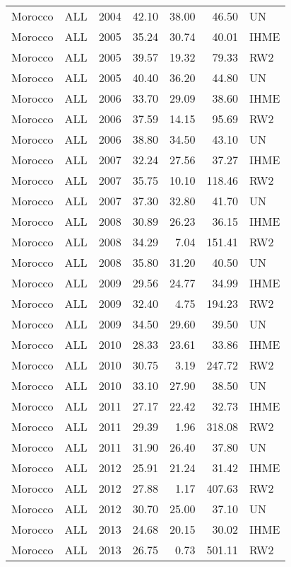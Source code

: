 \begin{longtable}{lllrrrl}
  Morocco & ALL & 2004 & 42.10 & 38.00 & 46.50 & UN \\ 
  Morocco & ALL & 2005 & 35.24 & 30.74 & 40.01 & IHME \\ 
  Morocco & ALL & 2005 & 39.57 & 19.32 & 79.33 & RW2 \\ 
  Morocco & ALL & 2005 & 40.40 & 36.20 & 44.80 & UN \\ 
  Morocco & ALL & 2006 & 33.70 & 29.09 & 38.60 & IHME \\ 
  Morocco & ALL & 2006 & 37.59 & 14.15 & 95.69 & RW2 \\ 
  Morocco & ALL & 2006 & 38.80 & 34.50 & 43.10 & UN \\ 
  Morocco & ALL & 2007 & 32.24 & 27.56 & 37.27 & IHME \\ 
  Morocco & ALL & 2007 & 35.75 & 10.10 & 118.46 & RW2 \\ 
  Morocco & ALL & 2007 & 37.30 & 32.80 & 41.70 & UN \\ 
  Morocco & ALL & 2008 & 30.89 & 26.23 & 36.15 & IHME \\ 
  Morocco & ALL & 2008 & 34.29 & 7.04 & 151.41 & RW2 \\ 
  Morocco & ALL & 2008 & 35.80 & 31.20 & 40.50 & UN \\ 
  Morocco & ALL & 2009 & 29.56 & 24.77 & 34.99 & IHME \\ 
  Morocco & ALL & 2009 & 32.40 & 4.75 & 194.23 & RW2 \\ 
  Morocco & ALL & 2009 & 34.50 & 29.60 & 39.50 & UN \\ 
  Morocco & ALL & 2010 & 28.33 & 23.61 & 33.86 & IHME \\ 
  Morocco & ALL & 2010 & 30.75 & 3.19 & 247.72 & RW2 \\ 
  Morocco & ALL & 2010 & 33.10 & 27.90 & 38.50 & UN \\ 
  Morocco & ALL & 2011 & 27.17 & 22.42 & 32.73 & IHME \\ 
  Morocco & ALL & 2011 & 29.39 & 1.96 & 318.08 & RW2 \\ 
  Morocco & ALL & 2011 & 31.90 & 26.40 & 37.80 & UN \\ 
  Morocco & ALL & 2012 & 25.91 & 21.24 & 31.42 & IHME \\ 
  Morocco & ALL & 2012 & 27.88 & 1.17 & 407.63 & RW2 \\ 
  Morocco & ALL & 2012 & 30.70 & 25.00 & 37.10 & UN \\ 
  Morocco & ALL & 2013 & 24.68 & 20.15 & 30.02 & IHME \\ 
  Morocco & ALL & 2013 & 26.75 & 0.73 & 501.11 & RW2 \\ 

\end{longtable}
